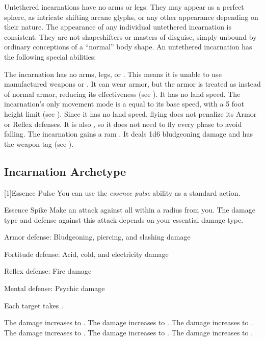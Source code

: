     Untethered incarnations have no arms or legs.
    They may appear as a perfect sphere, as intricate shifting arcane glyphs, or any other appearance depending on their nature.
    The appearance of any individual untethered incarnation is consistent.
    They are not shapeshifters or masters of disguise, simply unbound by ordinary conceptions of a ``normal'' body shape.
    An untethered incarnation has the following special abilities:
    \begin{raggeditemize}
         The incarnation has no arms, legs, or .
            This means it is unable to use manufactured weapons or .
            It can wear armor, but the armor is treated as  instead of normal armor, reducing its effectiveness (see ).
            It has no land speed.
         The incarnation's only movement mode is a  equal to its base speed, with a 5 foot height limit (see ).
            Since it has no land speed, flying does not penalize its Armor or Reflex defenses.
            It is also , so it does not need to fly every phase to avoid falling.
         The incarnation gains a ram .
            It deals 1d6 bludgeoning damage and has the  weapon tag (see ).
    \end{raggeditemize}

    \subsection{Incarnation Archetype}

    [1]{Essence Pulse} You can use the \textit{essence pulse} ability as a standard action.
    \begin{magicalactiveability}{Essence Spike}
        \rankline
        Make an attack against all  within a \smallarea radius from you.
        The damage type and defense against this attack depends on your essential damage type.
        \begin{raggeditemize}
            \item Armor defense: Bludgeoning, piercing, and slashing damage
            \item Fortitude defense: Acid, cold, and electricity damage
            \item Reflex defense: Fire damage
            \item Mental defense: Psychic damage
        \end{raggeditemize}
        \hit Each target takes \damagerankone{}.

        \rankline
         The damage increases to \damageranktwo{}.
         The damage increases to \damagerankthree{}.
         The damage increases to \damagerankfour{}.
         The damage increases to \damagerankfive{}.
         The damage increases to \damageranksix{}.
         The damage increases to \damagerankseven{}.
    \end{magicalactiveability}

